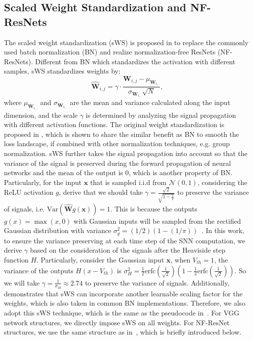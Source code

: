 \documentclass{article}
\begin{document}
\subsection{Scaled Weight Standardization and NF-ResNets}

The scaled weight standardization (sWS) is proposed in \cite{brock2021characterizing,brock2021high} to replace the commonly used batch normalization (BN) and realize normalization-free ResNets (NF-ResNets). Different from BN which standardizes the activation with different samples, sWS standardizes weights by:
\begin{equation}
    \hat{\mathbf{W}}_{i,j}=\gamma \cdot \frac{\mathbf{W}_{i,j}-\mu_{\mathbf{W}_{i,\cdot}}}{\sigma_{\mathbf{W}_{i,\cdot}}\sqrt{N}},
\end{equation}
where $\mu_{\mathbf{W}_{i,\cdot}}$ and $\sigma_{\mathbf{W}_{i,\cdot}}$ are the mean and variance calculated along the input dimension, and the scale $\gamma$ is determined by analyzing the signal propagation with different activation functions. The original weight standardization is proposed in \cite{qiao2019weight}, which is shown to share the similar benefit as BN to smooth the loss landscape, if combined with other normalization techniques, e.g. group normalization. sWS further takes the signal propagation into account so that the variance of the signal is preserved during the forward propagation of neural networks and the mean of the output is 0, which is another property of BN. Particularly, for the input $\mathbf{x}$ that is sampled i.i.d from $\mathcal{N}(0, 1)$, considering the ReLU activation $g$, \cite{brock2021characterizing} derive that we should take $\gamma=\frac{\sqrt{2}}{\sqrt{1-\frac{1}{\pi}}}$ to preserve the variance of signals, i.e. $\text{Var}(\hat{\mathbf{W}}g(\mathbf{x}))=1$. This is because the outputs $g(x)=\max(x, 0)$ with Gaussian inputs will be sampled from the rectified Gaussian distribution with variance $\sigma_g^2=(1/2)(1 - (1/\pi))$~\cite{brock2021characterizing}. In this work, to ensure the variance preserving at each time step of the SNN computation, we derive $\gamma$ based on the consideration of the signals after the Heaviside step function $H$. Particularly, consider the Gaussian input $\mathbf{x}$, when $V_{th}=1$, the variance of the outputs $H(x-V_{th})$ is $\sigma_H^2=\frac{1}{2}\text{erfc}(\frac{1}{\sqrt{2}})\left(1 - \frac{1}{2}\text{erfc}(\frac{1}{\sqrt{2}})\right)$. So we will take $\gamma = \frac{1}{\sigma_H}\approx 2.74$ to preserve the variance of signals. Additionally, \cite{brock2021characterizing} demonstrates that sWS can incorporate another learnable scaling factor for the weights, which is also taken in common BN implementations. Therefore, we also adopt this sWS technique, which is the same as the pseudocode in~\cite{brock2021characterizing}. For VGG network structures, we directly impose sWS on all weights. For NF-ResNet structures, we use the same structure as in~\cite{brock2021characterizing}, which is briefly introduced below.
\end{document}
